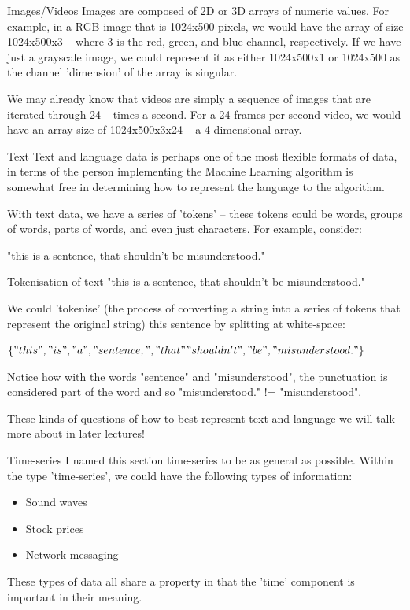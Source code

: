 \documentclass[10pt]{beamer}
\begin{document}
\begin{frame}[label={sec:orgf30bd13}]{Images/Videos}
Images are composed of 2D or 3D arrays of numeric values. For example, in a RGB
image that is 1024x500 pixels, we would have the array of size 1024x500x3 -- where 3
is the red, green, and blue channel, respectively. If we have just a grayscale image,
we could represent it as either 1024x500x1 or 1024x500 as the channel 'dimension' of
the array is singular.

We may already know that videos are simply a sequence of images that are iterated
through 24+ times a second. For a 24 frames per second video, we would have an array
size of 1024x500x3x24 -- a 4-dimensional array.
\end{frame}

\begin{frame}[label={sec:orgd64a5f9}]{Text}
Text and language data is perhaps one of the most flexible formats of data, in terms
of the person implementing the Machine Learning algorithm is somewhat free in
determining how to represent the language to the algorithm.

With text data, we have a series of 'tokens' -- these tokens could be words, groups
of words, parts of words, and even just characters. For example, consider:

"this is a sentence, that shouldn't be misunderstood."
\end{frame}

\begin{frame}[label={sec:org109e8df}]{Tokenisation of text}
"this is a sentence, that shouldn't be misunderstood."

We could 'tokenise' (the process of converting a string into a series of tokens that
represent the original string) this sentence by splitting at white-space:

\(\{"this", "is", "a", "sentence,", "that" "shouldn't", "be", "misunderstood."\}\)

Notice how with the words "sentence" and "misunderstood", the punctuation is
considered part of the word and so "misunderstood." != "misunderstood".

These kinds of questions of how to best represent text and language we will talk more
about in later lectures!
\end{frame}

\begin{frame}[label={sec:org6f244e1}]{Time-series}
I named this section time-series to be as general as possible. Within the type
'time-series', we could have the following types of information:

\begin{itemize}
\item Sound waves
\item Stock prices
\item Network messaging
\end{itemize}

These types of data all share a property in that the 'time' component is important in
their meaning.  
\end{frame}
\end{document}
